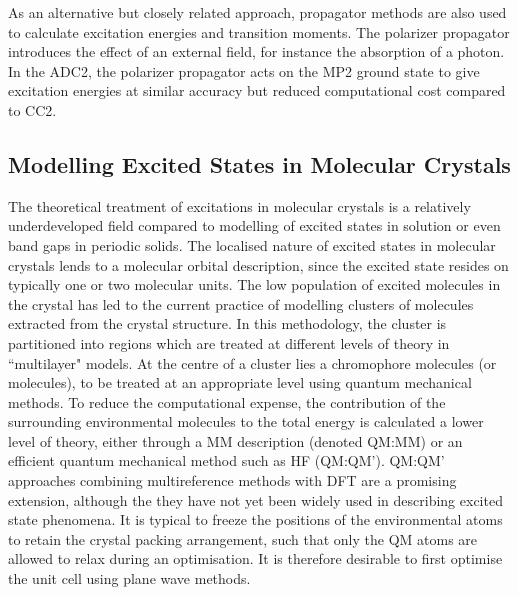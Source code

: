As an alternative but closely related approach, propagator methods are also used to calculate excitation energies and transition moments. The polarizer propagator introduces the effect of an external field, for instance the absorption of a photon. In the \ac{ADC2}, the polarizer propagator acts on the \ac{MP2} ground state to give excitation energies at similar accuracy but reduced computational cost compared to \ac{CC}2.

\subsection{Modelling Excited States in Molecular Crystals} \label{section: excited_states_crystals}
The theoretical treatment of excitations in molecular crystals is a relatively underdeveloped field compared to modelling of excited states in solution or even band gaps in periodic solids. The localised nature of excited states in molecular crystals lends to a molecular orbital description, since the excited state resides on typically one or two molecular units.\cite{Sauer1989} The low population of excited molecules in the crystal has led to the current practice of modelling clusters of molecules extracted from the crystal structure. In this methodology, the cluster is partitioned into regions which are treated at different levels of theory in ``multilayer" models. At the centre of a cluster lies a chromophore molecules (or molecules), to be treated at an appropriate level using quantum mechanical methods. To reduce the computational expense, the contribution of the surrounding environmental molecules to the total energy is calculated a lower level of theory, either through a \acf{MM} description (denoted QM:MM) or an efficient quantum mechanical method such as \ac{HF} (QM:QM'). QM:QM' approaches combining multireference methods with DFT are a promising extension, although the they have not yet been widely used in describing excited state phenomena.\cite{Libisch2014,Cheng2017,Cheng2017a} It is typical to freeze the positions of the environmental atoms to retain the crystal packing arrangement, such that only the QM atoms are allowed to relax during an optimisation. It is therefore desirable to first optimise the unit cell using plane wave methods.\cite{Presti2016} 

